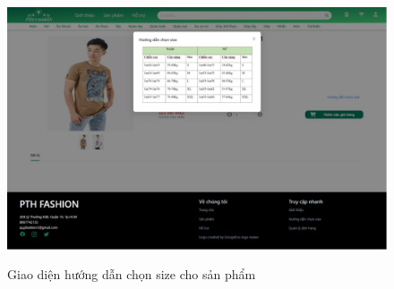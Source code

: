 \begin{figure}[!htp]
    \centering
    \includegraphics[width=5in]{img/UI/new_customer/guide_size.png}
    \label{10}
    \newline
    \caption{Giao diện hướng dẫn chọn size cho sản phẩm}
\end{figure}
\newpage

